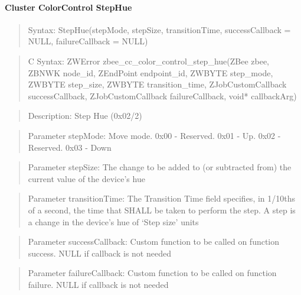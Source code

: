 \paragraph{Cluster ColorControl StepHue}
\begin{quote}Syntax: StepHue(stepMode, stepSize, transitionTime, successCallback = NULL, failureCallback = NULL)\end{quote}
\begin{quote}C Syntax: ZWError zbee\_cc\_color\_control\_step\_hue(ZBee zbee, ZBNWK node\_id, ZEndPoint endpoint\_id, ZWBYTE step\_mode, ZWBYTE step\_size, ZWBYTE transition\_time, ZJobCustomCallback successCallback, ZJobCustomCallback failureCallback, void* callbackArg)\end{quote}
\begin{quote}Description: Step Hue (0x02/2)\end{quote}
\begin{quote}Parameter stepMode: Move mode. 0x00 - Reserved. 0x01 - Up. 0x02 - Reserved. 0x03 - Down\end{quote}
\begin{quote}Parameter stepSize: The change to be added to (or subtracted from) the current value of the device’s hue\end{quote}
\begin{quote}Parameter transitionTime: The Transition Time field specifies, in 1/10ths of a second, the time that SHALL be taken to perform the step. A step is a change in the device’s hue of ‘Step size’ units\end{quote}
\begin{quote}Parameter successCallback: Custom function to be called on function success. NULL if callback is not needed\end{quote}
\begin{quote}Parameter failureCallback: Custom function to be called on function failure. NULL if callback is not needed\end{quote}


